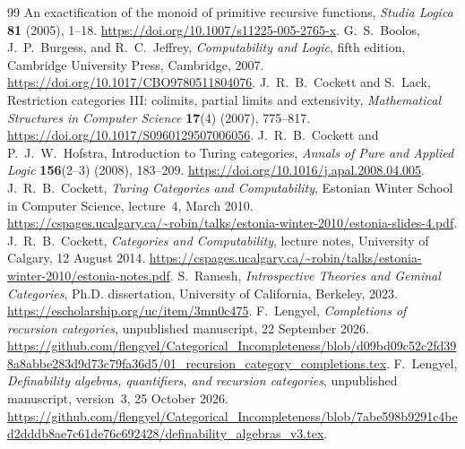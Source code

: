 \documentclass[11pt]{article}
\theoremstyle{definition}
\theoremstyle{remark}
\begin{document}
\begin{thebibliography}{99}
An exactification of the monoid of primitive recursive functions,
\emph{Studia Logica} \textbf{81} (2005), 1--18.
\url{https://doi.org/10.1007/s11225-005-2765-x}.
 G.~S.~Boolos, J.~P.~Burgess, and R.~C.~Jeffrey,
\emph{Computability and Logic}, fifth edition,
Cambridge University Press, Cambridge, 2007.
\url{https://doi.org/10.1017/CBO9780511804076}.
 J.~R.~B.~Cockett and S.~Lack,
Restriction categories III: colimits, partial limits and extensivity,
\emph{Mathematical Structures in Computer Science}
\textbf{17}(4) (2007), 775--817.
\url{https://doi.org/10.1017/S0960129507006056}.
 J.~R.~B.~Cockett and P.~J.~W.~Hofstra,
Introduction to Turing categories,
\emph{Annals of Pure and Applied Logic} \textbf{156}(2--3) (2008),
183--209. \url{https://doi.org/10.1016/j.apal.2008.04.005}.
 J.~R.~B.~Cockett,
\emph{Turing Categories and Computability},
Estonian Winter School in Computer Science, lecture~4, March 2010.
\url{https://cspages.ucalgary.ca/~robin/talks/estonia-winter-2010/estonia-slides-4.pdf}.
 J.~R.~B.~Cockett,
\emph{Categories and Computability},
lecture notes, University of Calgary, 12 August 2014.
\url{https://cspages.ucalgary.ca/~robin/talks/estonia-winter-2010/estonia-notes.pdf}.
 S.~Ramesh,
\emph{Introspective Theories and Geminal Categories},
Ph.D. dissertation, University of California, Berkeley, 2023.
\url{https://escholarship.org/uc/item/3mn0c475}.
 F.~Lengyel,
\emph{Completions of recursion categories},
unpublished manuscript, 22 September 2026.
\url{https://github.com/flengyel/Categorical_Incompleteness/blob/d09bd09c52c2fd398a8abbe283d9d73c79fa36d5/01_recursion_category_completions.tex}.
 F.~Lengyel,
\emph{Definability algebras, quantifiers, and recursion categories},
unpublished manuscript, version~3, 25 October 2026.
\url{https://github.com/flengyel/Categorical_Incompleteness/blob/7abe598b9291c4bed2dddb8ae7c61de76c692428/definability_algebras_v3.tex}.
\end{thebibliography}
\end{document}
